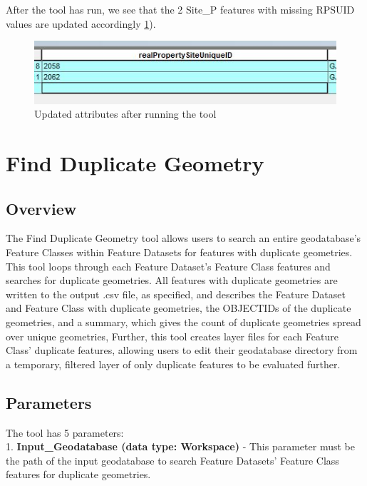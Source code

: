 \documentclass[openany]{book}
\theoremstyle{definition}
\theoremstyle{definition}
\theoremstyle{definition}
\theoremstyle{remark}
\begin{document}
After the tool has run, we see that the 2 Site\_P features with missing
RPSUID values are updated accordingly \ref{fig:sjcafter}).

\begin{figure}[H]

{\centering \includegraphics{figures/spatjoinCalc-after} 

}

\caption{Updated attributes after running the tool}\label{fig:sjcafter}
\end{figure}

\hypertarget{dupGeom}{\chapter{Find Duplicate Geometry}\label{dupGeom}}

\section{Overview}\label{overview-3}

The Find Duplicate Geometry tool allows users to search an entire
geodatabase's Feature Classes within Feature Datasets for features with
duplicate geometries. This tool loops through each Feature Dataset's
Feature Class features and searches for duplicate geometries. All
features with duplicate geometries are written to the output .csv file,
as specified, and describes the Feature Dataset and Feature Class with
duplicate geometries, the OBJECTIDs of the duplicate geometries, and a
summary, which gives the count of duplicate geometries spread over
unique geometries, Further, this tool creates layer files for each
Feature Class' duplicate features, allowing users to edit their
geodatabase directory from a temporary, filtered layer of only duplicate
features to be evaluated further.

\section{Parameters}\label{parameters-3}

The tool has 5 parameters:\\
1. \textbf{Input\_Geodatabase (data type: Workspace)} - This parameter
must be the path of the input geodatabase to search Feature Datasets'
Feature Class features for duplicate geometries.
\end{document}
